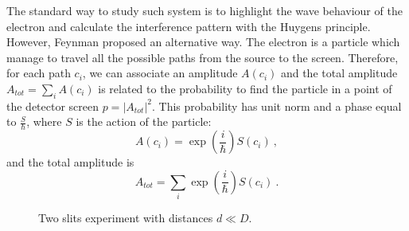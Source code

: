     The standard way to study such system is to highlight the wave behaviour of the electron and calculate the interference pattern with the Huygens principle. However, Feynman proposed an alternative way. The electron is a particle which manage to travel all the possible paths from the source to the screen. Therefore, for each path $c_i$, we can associate an amplitude $A (c_i)$ and the total amplitude $A_{tot} = \sum_i A(c_i)$ is related to the probability to find the particle in a point of the detector screen $p = |A_{tot}|^2$. This probability has unit norm and a phase equal to $\frac{S}{\hbar}$, where $S$ is the action of the particle:
    \begin{equation*}
        A(c_i) = \exp( \frac{i}{\hbar}) S(c_i) ~,
    \end{equation*}
    and the total amplitude is 
    \begin{equation*}
        A_{tot} = \sum_i \exp( \frac{i}{\hbar}) S(c_i) ~.
    \end{equation*}

    \begin{figure}[h!]
        \centering
        \caption{Two slits experiment with distances $d \ll D$.}
        \label{fig:b:slits2}
    \end{figure}

